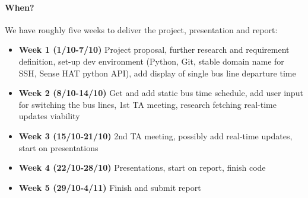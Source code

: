 \documentclass[oneside,a4paper]{paper}
\begin{document}
\paragraph{When?} We have roughly five weeks to deliver the project, presentation and report:

\begin{itemize}
	\item \textbf{Week 1 (1/10-7/10)} Project proposal, further research and requirement definition, set-up dev environment (Python, Git, stable domain name for SSH, Sense HAT python API), add display of single bus line departure time
	\item \textbf{Week 2 (8/10-14/10)} Get and add static bus time schedule, add user input for switching the bus lines, 1st TA meeting, research fetching real-time updates viability
	\item \textbf{Week 3 (15/10-21/10)} 2nd TA meeting, possibly add real-time updates, start on presentations
	\item \textbf{Week 4 (22/10-28/10)} Presentations, start on report, finish code
	\item \textbf{Week 5 (29/10-4/11)} Finish and submit report
\end{itemize}
\end{document}
